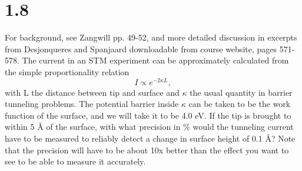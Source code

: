 \documentclass[12pt]{article}
\renewcommand{\=}[1]{\stackrel{#1}{=}} %
\theoremstyle{definition}
\theoremstyle{remark}
\begin{document}
\newpage
\section*{1.8}
\begin{bclogo}[logo=\bcquestion , barre=none]
\newline
For background, see Zangwill pp. 49-52, and more detailed discussion in excerpts from Desjonqueres and Spanjaard downloadable from course website, pages 571-578.
The current in an STM experiment can be approximately calculated from the simple proportionality relation
\[
	I \propto e^{-2\kappa L},
\]
with L the distance between tip and surface and $\kappa$ the usual quantity in barrier tunneling problems. The potential barrier inside $\kappa$ can be taken to be the work function of the surface, and we will take it to be 4.0 eV.
\vspace{2mm}
\newline
If the tip is brought to within 5 Å of the surface, with what precision in \% would the tunneling current have to be measured to reliably detect a change in surface height of 0.1 Å? Note that the precision will have to be about 10x better than the effect you want to see to be able to measure it accurately.
\end{bclogo}
\vspace{2cm}
\end{document}
